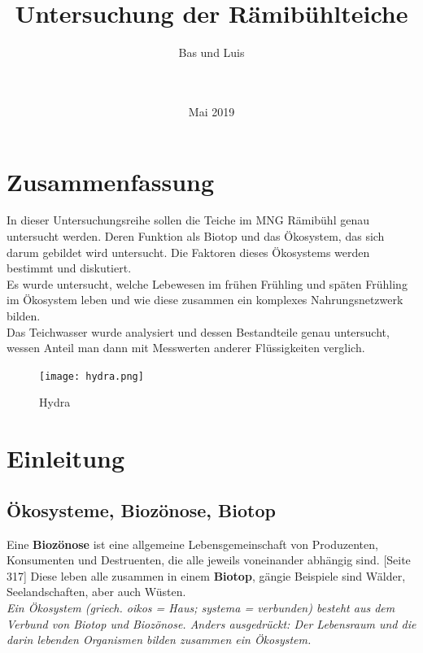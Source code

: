 \documentclass{article}
\title{\Huge{Untersuchung der Rämibühlteiche}}
\author{ \huge{Bas und Luis} \\ \\ \\
         \centering{\texttt{[image: Teichtitelbild.JPG]}}}
\date{Mai 2019}
\begin{document}
\maketitle

\newpage


\centering \section{Zusammenfassung}
In dieser Untersuchungsreihe sollen die Teiche im MNG Rämibühl genau untersucht werden. Deren Funktion als Biotop und das Ökosystem, das sich darum gebildet wird untersucht. Die Faktoren dieses Ökosystems werden bestimmt und diskutiert. \\
\vspace{5mm}
Es wurde untersucht, welche Lebewesen im frühen Frühling und späten Frühling im Ökosystem leben und wie diese zusammen ein komplexes Nahrungsnetzwerk bilden. \\
\vspace{5mm}
Das Teichwasser wurde analysiert und dessen Bestandteile genau untersucht, wessen Anteil man dann mit Messwerten anderer Flüssigkeiten verglich.

\begin{figure}[h!]
\centering
\texttt{[image: hydra.png]}
\caption{Hydra}
\label{fig:universe}
\end{figure}

\section{Einleitung}

    \subsection{Ökosysteme, Biozönose, Biotop}
        
        Eine \textbf{Biozönose} ist eine allgemeine Lebensgemeinschaft von Produzenten, Konsumenten und Destruenten, die alle jeweils voneinander abhängig sind. \cite{Biobuch}[Seite 317]
        Diese leben alle zusammen in einem \textbf{Biotop}, gängie Beispiele sind Wälder, Seelandschaften, aber auch Wüsten. \\
        \vspace{5mm}
        \textit{
        Ein Ökosystem (griech. oikos = Haus; systema = verbunden) besteht aus dem Verbund von Biotop und Biozönose. Anders ausgedrückt: Der Lebensraum und die darin lebenden Organismen bilden zusammen ein Ökosystem. \cite{Biologie-schule.de} } \\
        
\end{document}
